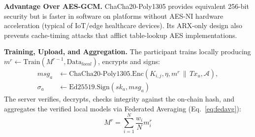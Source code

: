 \documentclass[journal, 10pt, twocolumn]{IEEEtran}
\begin{document}
\textbf{Advantage Over AES-GCM.} ChaCha20-Poly1305 provides equivalent 256-bit security but is faster in software on platforms without AES-NI hardware acceleration (typical of IoT/edge healthcare devices). Its ARX-only design also prevents cache-timing attacks that afflict table-lookup AES implementations.

\textbf{Training, Upload, and Aggregation.} The participant trains locally producing $m^r \leftarrow \text{Train}(M^{r-1}, \text{Data}_{local})$, encrypts and signs:
\begin{equation}
\begin{split}
msg_a &\leftarrow \text{ChaCha20-Poly1305.Enc}(K_{i,j}, \eta, m^r \,\|\, Tx_u, \mathcal{A}), \\
\sigma_a &\leftarrow \text{Ed25519.Sign}(sk_a, msg_a)
\end{split}
\label{eq:participant_send}
\end{equation}
The server verifies, decrypts, checks integrity against the on-chain hash, and aggregates the verified local models via Federated Averaging (Eq.~\eqref{eq:fedavg}):
\begin{equation}
M^r = \sum_{i=1}^{N} \frac{w_i}{N} m_i^r
\label{eq:fedavg}
\end{equation}
\end{document}
